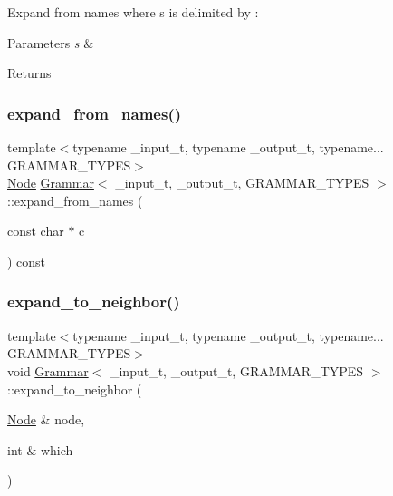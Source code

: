 Expand from names where s is delimited by \textquotesingle{}\+:\textquotesingle{} 
\begin{DoxyParams}{Parameters}
{\em s} & \\
\hline
\end{DoxyParams}
\begin{DoxyReturn}{Returns}

\end{DoxyReturn}
\mbox{\label{class_grammar_ae77fa63427506125ba51374826ce3800}} 
\subsubsection{\texorpdfstring{expand\+\_\+from\+\_\+names()}{expand\_from\_names()}\hspace{0.1cm}{\footnotesize\ttfamily [3/3]}}
{\footnotesize\ttfamily template$<$typename \+\_\+input\+\_\+t, typename \+\_\+output\+\_\+t, typename... G\+R\+A\+M\+M\+A\+R\+\_\+\+T\+Y\+P\+ES$>$ \\
\hyperlink{class_node}{Node} \hyperlink{class_grammar}{Grammar}$<$ \+\_\+input\+\_\+t, \+\_\+output\+\_\+t, G\+R\+A\+M\+M\+A\+R\+\_\+\+T\+Y\+P\+ES $>$\+::expand\+\_\+from\+\_\+names (\begin{DoxyParamCaption}\item[{const char $\ast$}]{c }\end{DoxyParamCaption}) const\hspace{0.3cm}{\ttfamily [inline]}}

\mbox{\label{class_grammar_a5849e85e2c5b34174f82f9c784c92fe2}} 
\subsubsection{\texorpdfstring{expand\+\_\+to\+\_\+neighbor()}{expand\_to\_neighbor()}}
{\footnotesize\ttfamily template$<$typename \+\_\+input\+\_\+t, typename \+\_\+output\+\_\+t, typename... G\+R\+A\+M\+M\+A\+R\+\_\+\+T\+Y\+P\+ES$>$ \\
void \hyperlink{class_grammar}{Grammar}$<$ \+\_\+input\+\_\+t, \+\_\+output\+\_\+t, G\+R\+A\+M\+M\+A\+R\+\_\+\+T\+Y\+P\+ES $>$\+::expand\+\_\+to\+\_\+neighbor (\begin{DoxyParamCaption}\item[{\hyperlink{class_node}{Node} \&}]{node,  }\item[{int \&}]{which }\end{DoxyParamCaption})\hspace{0.3cm}{\ttfamily [inline]}}

